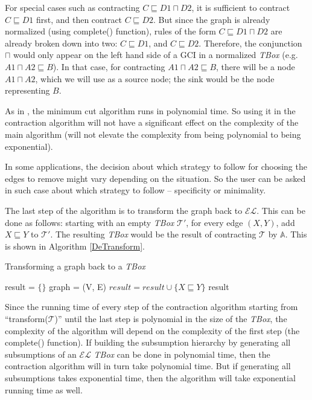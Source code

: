 For special cases such as contracting $C \sqsubseteq D1 \sqcap D2$, it is sufficient to contract $C \sqsubseteq D1$ first, and then contract $C \sqsubseteq D2$. But since the graph is already normalized (using complete() function), rules of the form $C \sqsubseteq D1 \sqcap D2$ are already broken down into two: $C \sqsubseteq D1$, and $C \sqsubseteq D2$. Therefore, the conjunction $\sqcap$ would only appear on the left hand side of a GCI in a normalized \textit{TBox} (e.g. $A1 \sqcap A2 \sqsubseteq B$). In that case, for contracting $A1 \sqcap A2 \sqsubseteq B$, there will be a node $A1 \sqcap A2$, which we will use as a source node; the sink would be the node representing $B$. 

As in \cite{alg}, the minimum cut algorithm runs in polynomial time. So using it in the contraction algorithm will not have a significant effect on the complexity of the main algorithm (will not elevate the complexity from being polynomial to being exponential). 

In some applications, the decision about which strategy to follow for choosing the edges to remove might vary depending on the situation. So the user can be asked in such case about which strategy to follow -- specificity or minimality. 

The last step of the algorithm is to transform the graph back to $\mathcal{EL}$. This can be done as follows: starting with an empty \textit{TBox} $\mathcal{T'}$, for every edge $(X, Y)$, add $X \sqsubseteq Y$ to $\mathcal{T'}$. The resulting \textit{TBox} would be the result of contracting $\mathcal{T}$ by $\mathbb{A}$. This is shown in Algorithm \ref{DeTransform}.

\begin{algorithm}
\caption{Transforming a graph back to a \textit{TBox}}
\label{DeTransform}
\begin{algorithmic}[1]
\State result = $\{\}$
\State graph = (V, E)
\State $result = result \cup \{X \sqsubseteq Y\}$
\EndFor
\State \Return result
\EndFunction
\end{algorithmic}
\end{algorithm}

Since the running time of every step of the contraction algorithm starting from ``transform($ \mathcal{T} $)'' until the last step is polynomial in the size of the \textit{TBox}, the complexity of the algorithm will depend on the complexity of the first step (the complete() function). If building the subsumption hierarchy by generating all subsumptions of an $\mathcal{EL}$ \textit{TBox} can be done in polynomial time, then the contraction algorithm will in turn take polynomial time. But if generating all subsumptions takes exponential time, then the algorithm will take exponential running time as well.

